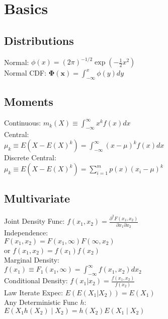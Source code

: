 \section{Basics}
\subsection*{Distributions}
Normal: $\phi(x) = (2\pi)^{-1/2}\exp (- \frac{1}{2}x^2)$\\
Normal CDF: $\mathbf{\Phi(x)} = \int_{-\infty}^{x} \phi(y) dy$\\
\subsection*{Moments}
Continuous: $m_k (X) \equiv \int_{-\infty}^{\infty} x^k f(x)dx$\\
Central:\\
$\mu_k \equiv E(X - E(X)^k) = \int_{-\infty}^{\infty} (x-\mu)^k f(x)dx$\\
Discrete Central:\\
$\mu_k \equiv E(X - E(X)^k) = \sum_{i=1}^{m} p(x)(x_i-\mu)^k$\\
\subsection*{Multivariate}
Joint Density Func: $f(x_1, x_2) = \frac{\partial^2 F(x_1, x_2)}{\partial x_1 \partial x_2}$\\
Independence:\\
$F(x_1, x_2) = F(x_1, \infty)F(\infty, x_2)$\\
or $f(x_1, x_2) = f(x_1)f(x_2)$\\
Marginal Density:\\
$f(x_1) \equiv F_1 (x_1, \infty) = \int_{-\infty}^{\infty} f(x_1, x_2) dx_2$\\
Conditional Density: $f(x_1 \vert x_2) = \frac{f(x_1, x_2)}{f(x_2)}$\\
Law Iterate Expec: $E(E(X_1 \vert X_2)) = E(X_1)$\\
Any Deterministic Func $h$:\\
$E(X_1 h(X_2) \mid X_2) = h(X_2)E(X_1 \mid X_2)$\\
